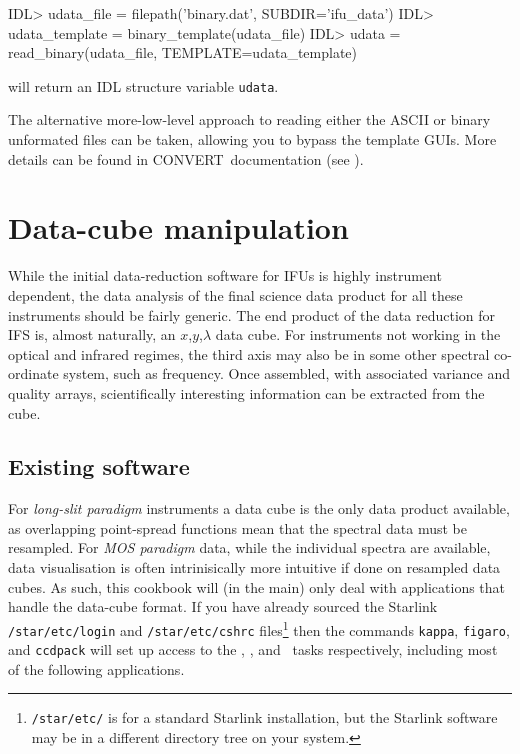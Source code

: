 \documentclass[twoside,11pt]{starlink}
\providecommand{\CCDPACK}{{\footnotesize CCDPACK}\normalsize}
\providecommand{\CCDPACKref}{\xref{\CCDPACK}{sun139}{}}
\providecommand{\CONVERT}{{\footnotesize CONVERT}\normalsize}
\providecommand{\FIGARO}{{\footnotesize FIGARO}\normalsize}
\providecommand{\FIGAROref}{\xref{\FIGARO}{sun86}{}}
\providecommand{\KAPPA}{{\footnotesize KAPPA}\normalsize}
\providecommand{\KAPPAref}{\xref{\KAPPA}{sun95}{}}
\begin{document}
\begin{small}
\begin{terminalv}
IDL> udata_file = filepath('binary.dat', SUBDIR='ifu_data')
IDL> udata_template = binary_template(udata_file)
IDL> udata = read_binary(udata_file, TEMPLATE=udata_template)
\end{terminalv}
\end{small}

will return an IDL structure variable \texttt{udata}.

The alternative more-low-level approach to reading either the ASCII or
binary unformated files can be taken, allowing you to bypass the
template GUIs.  More details can be found in \CONVERT\ documentation (see
).

\newpage
\section{Data-cube manipulation\label{sc16_datacube}}

While the initial data-reduction software for IFUs is highly
instrument dependent, the data analysis of the final science data
product for all these instruments should be fairly generic.  The end
product of the data reduction for IFS is, almost naturally, an
$x$,$y$,$\lambda$ data cube.  For instruments not working in the
optical and infrared regimes, the third axis may also be in some other
spectral co-ordinate system, such as frequency.  Once assembled, with
associated variance and quality arrays, scientifically interesting
information can be extracted from the cube.

\subsection{Existing software\label{sc16_exist}}

For \emph{long-slit paradigm} instruments a data cube is the only data
product available, as overlapping point-spread functions mean that the
spectral data must be resampled.  For \emph{MOS paradigm} data, while
the individual spectra are available, data visualisation is often
intrinisically more intuitive if done on resampled data cubes.  As
such, this cookbook will (in the main) only deal with applications
that handle the data-cube format.  If you have already sourced the
Starlink \texttt{/star/etc/login} and \texttt{/star/etc/cshrc}
files\footnote{\texttt{/star/etc/} is for a standard Starlink installation,
but the Starlink software may be in a different directory tree on your
system.} then the commands \texttt{kappa}, \texttt{figaro}, and \texttt{ccdpack} will set up access to the \KAPPAref, \FIGAROref, and
\CCDPACKref\ tasks respectively, including most of the following
applications.
\end{document}

